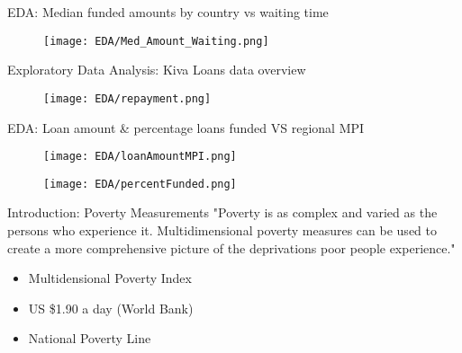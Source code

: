 \documentclass[10pt]{beamer}
\begin{document}
\begin{frame}{EDA: Median funded amounts by country vs waiting time}
        \begin{figure}
        \centering
        \texttt{[image: EDA/Med\_Amount\_Waiting.png]}
    \end{figure}
\end{frame}


\begin{frame}{Exploratory Data Analysis: Kiva Loans data overview}
        \begin{figure}
        \centering
        \texttt{[image: EDA/repayment.png]}
    \end{figure}
    \end{frame}  
    
\begin{frame}{EDA: Loan amount & percentage loans funded VS regional MPI}
\begin{figure}
\centering
\begin{minipage}{.5\textwidth}
  \centering
  \texttt{[image: EDA/loanAmountMPI.png]}
  \label{fig:test1}
\end{minipage}%
\begin{minipage}{.5\textwidth}
  \centering
  \texttt{[image: EDA/percentFunded.png]}
  \label{fig:test2}
\end{minipage}
\end{figure}
\end{frame}



\begin{frame}{Introduction: Poverty Measurements}
"Poverty is as complex and varied as the persons who experience it. Multidimensional poverty measures can be used to create a more comprehensive picture of the deprivations poor people experience."

\begin{itemize}
    \item Multidensional Poverty Index \\
    \item US \$1.90 a day (World Bank)\\
    \item National Poverty Line \\
 
\end{itemize}

\end{frame}
\end{document}
